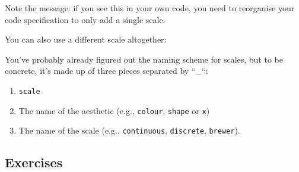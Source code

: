 Note the message: if you see this in your own code, you need to
reorganise your code specification to only add a single scale.

You can also use a different scale altogether:

\begin{Shaded}
\begin{Highlighting}[]
\StringTok{ }
\StringTok{  }\NormalTok{(}\NormalTok{(} 
\StringTok{  }\NormalTok{() +}\StringTok{ }
\StringTok{  }\NormalTok{()}
\end{Highlighting}
\end{Shaded}

You've probably already figured out the naming scheme for scales, but to
be concrete, it's made up of three pieces separated by ``\_``:

\begin{enumerate}
\def\labelenumi{\arabic{enumi}.}
\itemsep1pt\parskip0pt
\item
  \texttt{scale}
\item
  The name of the aesthetic (e.g., \texttt{colour}, \texttt{shape} or
  \texttt{x})
\item
  The name of the scale (e.g., \texttt{continuous}, \texttt{discrete},
  \texttt{brewer}).
\end{enumerate}

\subsection{Exercises}

